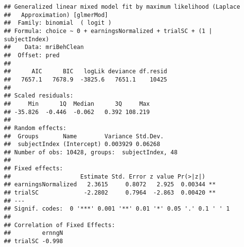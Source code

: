 \documentclass[]{article}
\begin{document}
\begin{verbatim}
## Generalized linear mixed model fit by maximum likelihood (Laplace
##   Approximation) [glmerMod]
##  Family: binomial  ( logit )
## Formula: choice ~ 0 + earningsNormalized + trialSC + (1 | subjectIndex)
##    Data: mriBehClean
##  Offset: pred
## 
##      AIC      BIC   logLik deviance df.resid 
##   7657.1   7678.9  -3825.6   7651.1    10425 
## 
## Scaled residuals: 
##     Min      1Q  Median      3Q     Max 
## -35.826  -0.446  -0.062   0.392 108.219 
## 
## Random effects:
##  Groups       Name        Variance Std.Dev.
##  subjectIndex (Intercept) 0.003929 0.06268 
## Number of obs: 10428, groups:  subjectIndex, 48
## 
## Fixed effects:
##                    Estimate Std. Error z value Pr(>|z|)   
## earningsNormalized   2.3615     0.8072   2.925  0.00344 **
## trialSC             -2.2802     0.7964  -2.863  0.00420 **
## ---
## Signif. codes:  0 '***' 0.001 '**' 0.01 '*' 0.05 '.' 0.1 ' ' 1
## 
## Correlation of Fixed Effects:
##         ernngN
## trialSC -0.998
\end{verbatim}
\end{document}

